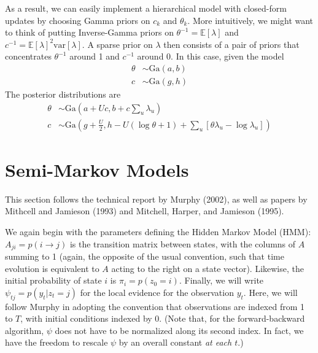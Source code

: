 \documentclass[11pt]{article}
\begin{document}
As a result, we can easily implement a hierarchical model with closed-form updates by choosing Gamma priors on $c_k$ and $\theta_k$. More intuitively, we might want to think of putting Inverse-Gamma priors on $\theta^{-1} = \mathbb{E}[\lambda]$ and $c^{-1} = \mathbb{E}[\lambda]^2 \mathrm{var}[\lambda]$. A sparse prior on $\lambda$ then consists of a pair of priors that concentrates $\theta^{-1}$ around 1 and $c^{-1}$ around 0. In this case, given the model
\begin{align}
    \theta &\sim \text{Ga}(a, b) \\
    c &\sim \text{Ga}(g, h)     
\end{align} 
The posterior distributions are
\begin{align}
    \theta &\sim \text{Ga}\left(a + Uc, b + c\sum_u \lambda_u \right) \\
    c &\sim \text{Ga}\left(g + \frac{U}{2}, h - U(\log \theta + 1) 
    + \sum_u \left[ \theta \lambda_u - \log \lambda_u \right]\right) 
\end{align}

\section{Semi-Markov Models}
This section follows the technical report by Murphy (2002), as well as papers by Mithcell and Jamieson (1993) and Mitchell, Harper, and Jamieson (1995).

We again begin with the parameters defining the Hidden Markov Model (HMM): $A_{ji} = p({i \rightarrow j})$ is the transition matrix between states, with the columns of $A$ summing to 1 (again, the opposite of the usual convention, such that time evolution is equivalent to $A$ acting to the right on a state vector). Likewise, the initial probability of state $i$ is $\pi_i = p(z_0 = i)$. Finally, we will write $\psi_{tj} = p(y_t|z_t = j)$ for the local evidence for the observation $y_t$. Here, we will follow Murphy in adopting the convention that observations are indexed from 1 to $T$, with initial conditions indexed by 0. (Note that, for the forward-backward algorithm, $\psi$ does not have to be normalized along its second index. In fact, we have the freedom to rescale $\psi$ by an overall constant \emph{at each $t$}.)
\end{document}
